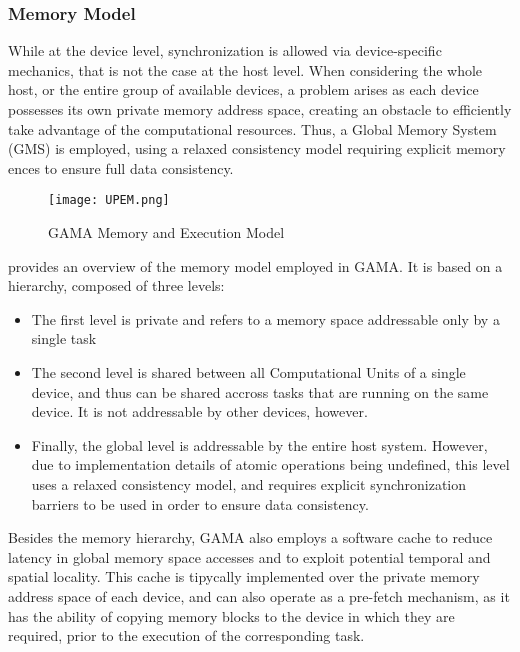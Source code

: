 \subsubsection{Memory Model}

While at the device level, synchronization is allowed via device-specific mechanics, that is not the case at the host level. When considering the whole host, or the entire group of available devices, a problem arises as each device possesses its own private memory address space, creating an obstacle to efficiently take advantage of the computational resources. Thus, a Global Memory System (GMS) is employed, using a relaxed consistency model requiring explicit memory ences to ensure full data consistency. 

\begin{figure}[!htp]
  \centering
  \texttt{[image: UPEM.png]}
  \caption{GAMA Memory and Execution Model}
  \label{fig:upem}
\end{figure}

 provides an overview of the memory model employed in GAMA. It is based on a hierarchy, composed of three levels:
\begin{itemize}
  \item The first level is private and refers to a memory space addressable only by a single task
  \item The second level is shared between all Computational Units of a single device, and thus can be shared accross tasks that are running on the same device. It is not addressable by other devices, however.
  \item Finally, the global level is addressable by the entire host system. However, due to implementation details of atomic operations being undefined, this level uses a relaxed consistency model, and requires explicit synchronization barriers to be used in order to ensure data consistency. 
\end{itemize}

Besides the memory hierarchy, GAMA also employs a software cache to reduce latency in global memory space accesses and to exploit potential temporal and spatial locality. This cache is tipycally implemented over the private memory address space of each device, and can also operate as a pre-fetch mechanism, as it has the ability of copying memory blocks to the device in which they are required, prior to the execution of the corresponding task.
